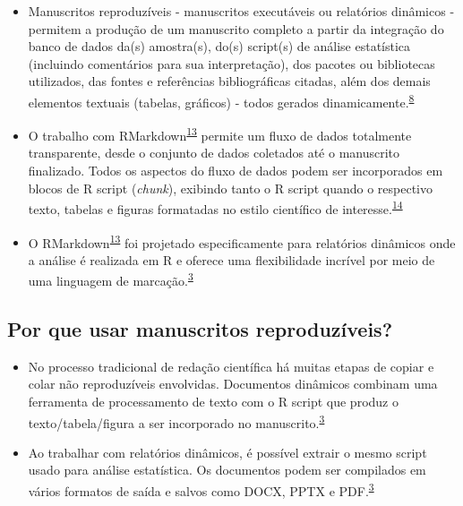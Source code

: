 \documentclass[
  a4paper,
]{book}
\begin{document}
\begin{itemize}
\item
  Manuscritos reproduzíveis - manuscritos executáveis ou relatórios dinâmicos - permitem a produção de um manuscrito completo a partir da integração do banco de dados da(s) amostra(s), do(s) script(s) de análise estatística (incluindo comentários para sua interpretação), dos pacotes ou bibliotecas utilizados, das fontes e referências bibliográficas citadas, além dos demais elementos textuais (tabelas, gráficos) - todos gerados dinamicamente.\textsuperscript{\protect\hyperlink{ref-hinsen2011}{8}}
\item
  O trabalho com RMarkdown\textsuperscript{\protect\hyperlink{ref-R-rmarkdown}{13}} permite um fluxo de dados totalmente transparente, desde o conjunto de dados coletados até o manuscrito finalizado. Todos os aspectos do fluxo de dados podem ser incorporados em blocos de R script (\emph{chunk}), exibindo tanto o R script quando o respectivo texto, tabelas e figuras formatadas no estilo científico de interesse.\textsuperscript{\protect\hyperlink{ref-holmes2021}{14}}
\item
  O RMarkdown\textsuperscript{\protect\hyperlink{ref-R-rmarkdown}{13}} foi projetado especificamente para relatórios dinâmicos onde a análise é realizada em R e oferece uma flexibilidade incrível por meio de uma linguagem de marcação.\textsuperscript{\protect\hyperlink{ref-mair2016}{3}}
\end{itemize}

\hypertarget{por-que-usar-manuscritos-reproduzuxedveis}{%
\subsection{Por que usar manuscritos reproduzíveis?}\label{por-que-usar-manuscritos-reproduzuxedveis}}

\begin{itemize}
\item
  No processo tradicional de redação científica há muitas etapas de copiar e colar não reproduzíveis envolvidas. Documentos dinâmicos combinam uma ferramenta de processamento de texto com o R script que produz o texto/tabela/figura a ser incorporado no manuscrito.\textsuperscript{\protect\hyperlink{ref-mair2016}{3}}
\item
  Ao trabalhar com relatórios dinâmicos, é possível extrair o mesmo script usado para análise estatística. Os documentos podem ser compilados em vários formatos de saída e salvos como DOCX, PPTX e PDF.\textsuperscript{\protect\hyperlink{ref-mair2016}{3}}
\end{itemize}
\end{document}
